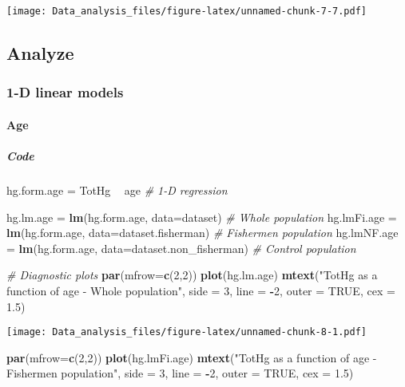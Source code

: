 \documentclass[12pt,]{article}
\newenvironment{Shaded}{\begin{snugshade}}{\end{snugshade}}
\newcommand{\KeywordTok}[1]{\textcolor[rgb]{0.13,0.29,0.53}{\textbf{#1}}}
\newcommand{\DataTypeTok}[1]{\textcolor[rgb]{0.13,0.29,0.53}{#1}}
\newcommand{\DecValTok}[1]{\textcolor[rgb]{0.00,0.00,0.81}{#1}}
\newcommand{\FloatTok}[1]{\textcolor[rgb]{0.00,0.00,0.81}{#1}}
\newcommand{\StringTok}[1]{\textcolor[rgb]{0.31,0.60,0.02}{#1}}
\newcommand{\CommentTok}[1]{\textcolor[rgb]{0.56,0.35,0.01}{\textit{#1}}}
\newcommand{\OtherTok}[1]{\textcolor[rgb]{0.56,0.35,0.01}{#1}}
\newcommand{\OperatorTok}[1]{\textcolor[rgb]{0.81,0.36,0.00}{\textbf{#1}}}
\newcommand{\NormalTok}[1]{#1}
\let\oldparagraph\paragraph
\renewcommand{\paragraph}[1]{\oldparagraph{#1}\mbox{}}
\let\oldsubparagraph\subparagraph
\renewcommand{\subparagraph}[1]{\oldsubparagraph{#1}\mbox{}}
\begin{document}
\texttt{[image: Data\_analysis\_files/figure-latex/unnamed-chunk-7-7.pdf]}

\subsection{Analyze}\label{analyze}

\subsubsection{1-D linear models}\label{d-linear-models}

\paragraph{Age}\label{age}

\subparagraph{Code}\label{code}

\begin{Shaded}
\begin{Highlighting}[]
\NormalTok{hg.form.age =}\StringTok{ }\NormalTok{TotHg }\OperatorTok{~}\StringTok{ }\NormalTok{age }\CommentTok{# 1-D regression}

\NormalTok{hg.lm.age =}\StringTok{ }\KeywordTok{lm}\NormalTok{(hg.form.age, }\DataTypeTok{data=}\NormalTok{dataset) }\CommentTok{# Whole population}
\NormalTok{hg.lmFi.age =}\StringTok{ }\KeywordTok{lm}\NormalTok{(hg.form.age, }\DataTypeTok{data=}\NormalTok{dataset.fisherman) }\CommentTok{# Fishermen population}
\NormalTok{hg.lmNF.age =}\StringTok{ }\KeywordTok{lm}\NormalTok{(hg.form.age, }\DataTypeTok{data=}\NormalTok{dataset.non_fisherman) }\CommentTok{# Control population}

\CommentTok{# Diagnostic plots}
\KeywordTok{par}\NormalTok{(}\DataTypeTok{mfrow=}\KeywordTok{c}\NormalTok{(}\DecValTok{2}\NormalTok{,}\DecValTok{2}\NormalTok{))}
\KeywordTok{plot}\NormalTok{(hg.lm.age)}
\KeywordTok{mtext}\NormalTok{(}\StringTok{"TotHg as a function of age - Whole population"}\NormalTok{, }\DataTypeTok{side =} \DecValTok{3}\NormalTok{, }\DataTypeTok{line =} \OperatorTok{-}\DecValTok{2}\NormalTok{, }\DataTypeTok{outer =} \OtherTok{TRUE}\NormalTok{, }\DataTypeTok{cex =} \FloatTok{1.5}\NormalTok{)}
\end{Highlighting}
\end{Shaded}

\texttt{[image: Data\_analysis\_files/figure-latex/unnamed-chunk-8-1.pdf]}

\begin{Shaded}
\begin{Highlighting}[]
\KeywordTok{par}\NormalTok{(}\DataTypeTok{mfrow=}\KeywordTok{c}\NormalTok{(}\DecValTok{2}\NormalTok{,}\DecValTok{2}\NormalTok{))}
\KeywordTok{plot}\NormalTok{(hg.lmFi.age)}
\KeywordTok{mtext}\NormalTok{(}\StringTok{"TotHg as a function of age - Fishermen population"}\NormalTok{, }\DataTypeTok{side =} \DecValTok{3}\NormalTok{, }\DataTypeTok{line =} \OperatorTok{-}\DecValTok{2}\NormalTok{, }\DataTypeTok{outer =} \OtherTok{TRUE}\NormalTok{, }\DataTypeTok{cex =} \FloatTok{1.5}\NormalTok{)}
\end{Highlighting}
\end{Shaded}
\end{document}
